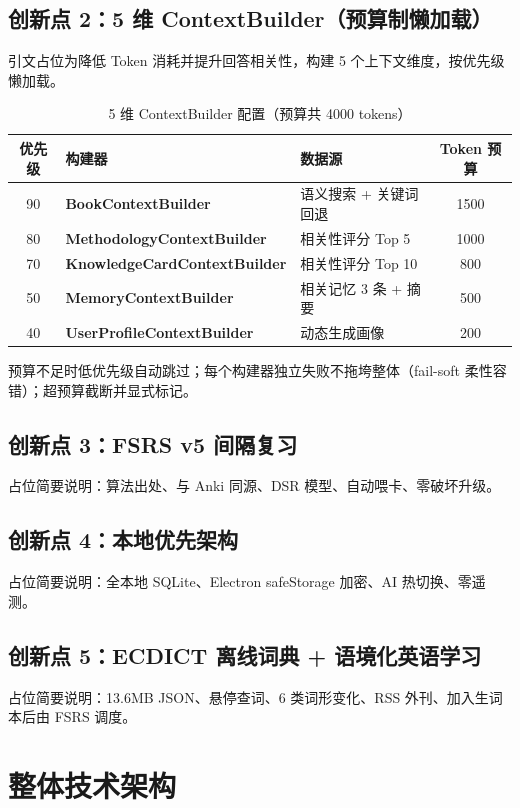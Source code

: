 \documentclass[12pt,a4paper,nomath]{harryopo-report}
\begin{document}
\subsection{创新点 2：5 维 ContextBuilder（预算制懒加载）}
{引文占位}为降低 Token 消耗并提升回答相关性，构建 5 个上下文维度，按优先级懒加载。

\begin{table}[htbp]
\centering
\begin{tabularx}{\textwidth}{c >{\bfseries}l X c}
\toprule
\textbf{优先级} & \textbf{构建器} & \textbf{数据源} & \textbf{Token 预算} \\
\midrule
90 & BookContextBuilder & 语义搜索 + 关键词回退 & 1500 \\
80 & MethodologyContextBuilder & 相关性评分 Top 5 & 1000 \\
70 & KnowledgeCardContextBuilder & 相关性评分 Top 10 & 800 \\
50 & MemoryContextBuilder & 相关记忆 3 条 + 摘要 & 500 \\
40 & UserProfileContextBuilder & 动态生成画像 & 200 \\
\bottomrule
\end{tabularx}
\caption{5 维 ContextBuilder 配置（预算共 4000 tokens）}
\label{tab:context-builder}
\end{table}

预算不足时低优先级自动跳过；每个构建器独立失败不拖垮整体（fail-soft 柔性容错）；超预算截断并显式标记。

\subsection{创新点 3：FSRS v5 间隔复习}
{占位}简要说明：算法出处、与 Anki 同源、DSR 模型、自动喂卡、零破坏升级。

\subsection{创新点 4：本地优先架构}
{占位}简要说明：全本地 SQLite、Electron safeStorage 加密、AI 热切换、零遥测。

\subsection{创新点 5：ECDICT 离线词典 + 语境化英语学习}
{占位}简要说明：13.6MB JSON、悬停查词、6 类词形变化、RSS 外刊、加入生词本后由 FSRS 调度。

\section{整体技术架构}
\end{document}
